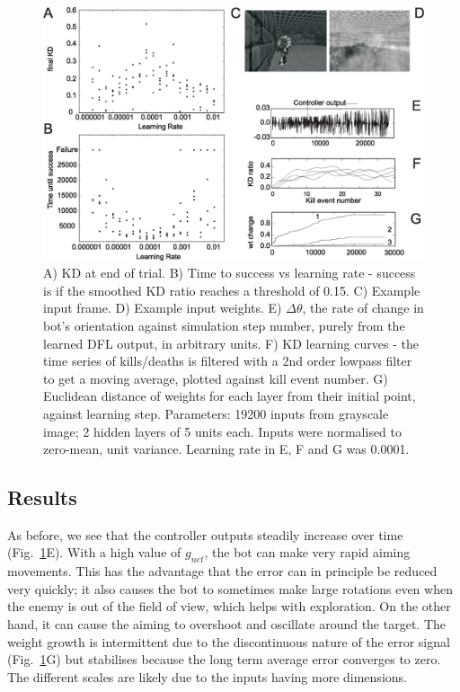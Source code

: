 \documentclass{article}
\begin{document}
\begin{figure}[!ht]
	\centering \includegraphics[width=\textwidth]{FPSFig7}
	\caption{A) KD at end of trial. B) Time to success vs learning
          rate - success is if the smoothed KD ratio reaches a
          threshold of 0.15. C) Example input frame. D) Example input weights.
          E) $\Delta \theta$, the rate of change in
          bot's orientation against simulation step number, purely
          from the learned DFL output, in arbitrary units. F) KD learning
          curves - the time series of kills/deaths is filtered with a
          2nd order lowpass filter to get a moving average, plotted
          against kill event number. G) Euclidean distance of weights
          for each layer from their initial point, against learning
          step.
          Parameters: 19200 inputs from grayscale image; 2
          hidden layers of 5 units each. Inputs were
          normalised to zero-mean, unit variance. Learning rate in E, F
          and G was 0.0001.
		\label{shooter_results}}
\end{figure}

\subsection{Results}
As before, we see that the controller outputs steadily increase over
time (Fig.~\ref{shooter_results}E). With a high value of $g_{net}$,
the bot can make very rapid aiming movements. This has the advantage
that the error can in principle be reduced very quickly; it also
causes the bot to sometimes make large rotations even when the enemy
is out of the field of view, which helps with exploration. On the
other hand, it can cause the aiming to overshoot and oscillate around
the target. The weight growth is intermittent due to the discontinuous
nature of the error signal (Fig.~\ref{shooter_results}G) but stabilises
because the long term average error converges to zero. The different
scales are likely due to the inputs having more dimensions.
\end{document}
